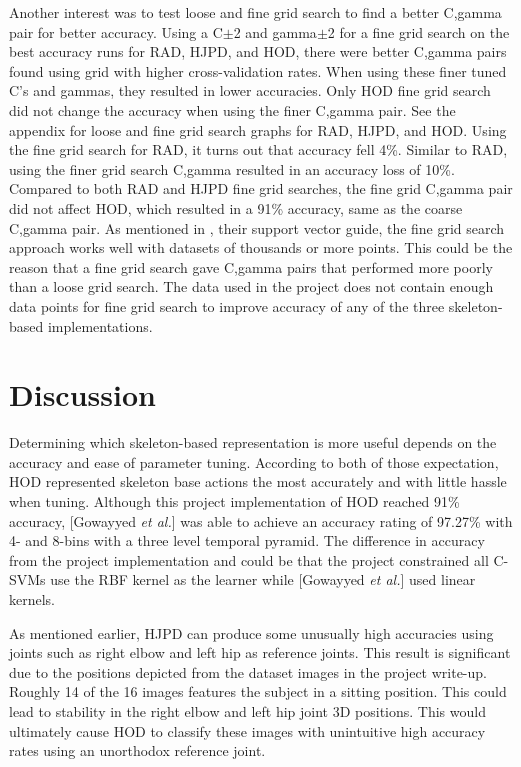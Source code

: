 \documentclass[11pt,nocopyrightspace]{config}
\begin{document}
Another interest was to test loose and fine grid search to find a better C,gamma pair for better accuracy. Using a C$\pm$2 and gamma$\pm$2 for a fine grid search on the best accuracy runs for RAD, HJPD, and HOD, there were better C,gamma pairs found using grid with higher cross-validation rates. When using these finer tuned C's and gammas, they resulted in lower accuracies. Only HOD fine grid search did not change the accuracy when using the finer C,gamma pair. See the appendix for loose and fine grid search graphs for RAD, HJPD, and HOD. Using the fine grid search for RAD, it turns out that accuracy fell 4\%. Similar to RAD, using the finer grid search C,gamma resulted in an accuracy loss of 10\%. Compared to both RAD and HJPD fine grid searches, the fine grid C,gamma pair did not affect HOD, which resulted in a 91\% accuracy, same as the coarse C,gamma pair. As mentioned in \cite{guide}, their support vector guide, the fine grid search approach works well with datasets of thousands or more points. This could be the reason that a fine grid search gave C,gamma pairs that performed more poorly than a loose grid search. The data used in the project does not contain enough data points for fine grid search to improve accuracy of any of the three skeleton-based implementations.

\section{Discussion}

Determining which skeleton-based representation is more useful depends on the accuracy and ease of parameter tuning. According to both of those expectation, HOD represented skeleton base actions the most accurately and with little hassle when tuning. Although this project implementation of HOD reached 91\% accuracy, [Gowayyed \textit{et al.}] was able to achieve an accuracy rating of 97.27\% with 4- and 8-bins with a three level temporal pyramid. The difference in accuracy from the project implementation and \cite{hodPaper} could be that the project constrained all C-SVMs use the RBF kernel as the learner while [Gowayyed \textit{et al.}] used linear kernels.

As mentioned earlier, HJPD can produce some unusually high accuracies using joints such as right elbow and left hip as reference joints. This result is significant due to the positions depicted from the dataset images in the project write-up. Roughly 14 of the 16 images features the subject in a sitting position. This could lead to stability in the right elbow and left hip joint 3D positions. This would ultimately cause HOD to classify these images with unintuitive high accuracy rates using an unorthodox reference joint.
\end{document}
